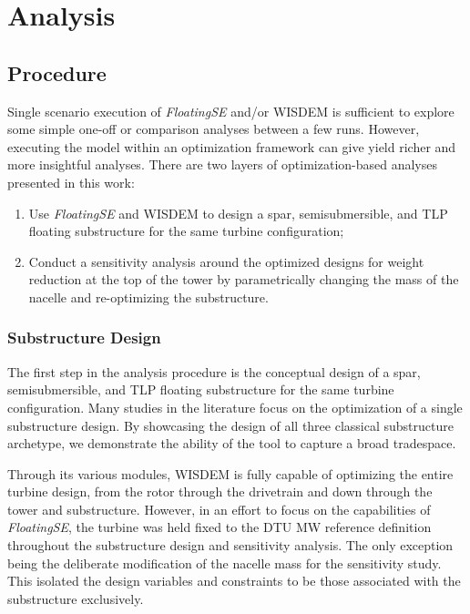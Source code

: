 \section{Analysis}
\label{sec:opt}

\subsection{Procedure}
Single scenario execution of \textit{FloatingSE} and/or WISDEM is
sufficient to explore some simple one-off or comparison analyses between
a few runs.  However, executing the model within an optimization
framework can give yield richer and more insightful analyses.  There are
two layers of optimization-based analyses presented in this work:

\begin{enumerate}
\item Use \textit{FloatingSE} and WISDEM to design a spar,
  semisubmersible, and TLP floating substructure for the same turbine
  configuration;
\item Conduct a sensitivity analysis around the optimized designs for
  weight reduction at the top of the tower by parametrically changing
  the mass of the nacelle and re-optimizing the substructure.
\end{enumerate}

\subsubsection{Substructure Design}
The first step in the analysis procedure is the conceptual design of a
spar, semisubmersible, and TLP floating substructure for the same
turbine configuration.  Many studies in the literature focus on the
optimization of a single substructure design.  By showcasing the design
of all three classical substructure archetype, we demonstrate the ability
of the tool to capture a broad tradespace.

Through its various modules, WISDEM is fully capable of optimizing the
entire turbine design, from the rotor through the drivetrain and down
through the tower and substructure.  However, in an effort to focus on
the capabilities of \textit{FloatingSE}, the turbine was held fixed to
the DTU \unit[10]{MW} reference definition throughout the substructure
design and sensitivity analysis.  The only exception being the
deliberate modification of the nacelle mass for the sensitivity study.
This isolated the design variables and constraints to be those
associated with the substructure exclusively.

